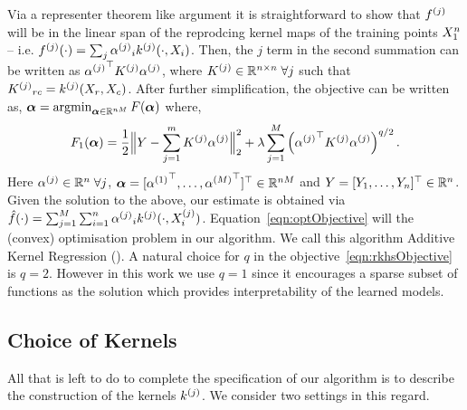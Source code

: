Via a representer theorem like argument it is straightforward to show
that $f^{(j)}$ will be in the linear span of the reprodcing kernel maps of the
training points $X_1^{n}$ -- i.e. $f^{(j)}(\cdot) = 
\sum_j {\alpha^{(j)}}_i k^{(j)}(\cdot, X_i) $.
Then, the $j$ term in the second summation can be written as
${{\alpha^{(j)}}}^\top {K^{(j)}} {\alpha^{(j)}}$,
where ${K^{(j)}} \in \mathbb{R}^{n\times n}\; \forall
j$ such that ${K^{(j)}}_{rc} = k^{(j)}(X_r, X_c)$.
After further simplification, the objective can be written as,
${\bm{\alpha}} = \mathop{\mathrm{argmin}}_{{\bm{\alpha}} \in \mathbb{R}^{nM}} F({\bm{\alpha}})$ where,
\begin{equation}
F_1({\bm{\alpha}}) = \frac{1}{2}\Big\|Y - \sum_{j=1}^m {K^{(j)}} {\alpha^{(j)}}\Big\|_2^2 + 
  \lambda \sum_{j=1}^M \left({{\alpha^{(j)}}}^\top {K^{(j)}} {\alpha^{(j)}}\right)^{q/2}.
\label{eqn:optObjective}
\end{equation}
Here ${\alpha^{(j)}} \in \mathbb{R}^n \; \forall j$, ${\bm{\alpha}} = [{\alpha^{(1)}}^\top, \dots, 
{\alpha^{(M)}}^\top]^\top  \in\mathbb{R}^{nM}$ and $Y = [Y_1, \dots, Y_n]^\top \in
\mathbb{R}^n$. Given the solution to the above, our
estimate is obtained via $\hat{f}(\cdot) = \sum_{j=1}^M \sum_{i=1}^n {\alpha^{(j)}}_i
k^{(j)}(\cdot, X^{(j)}_i)$.
Equation~\eqref{eqn:optObjective} will the (convex) optimisation problem in our
algorithm.
We call this algorithm Additive Kernel Regression (\addkrr).
A natural choice for $q$ in the objective~\eqref{eqn:rkhsObjective} is $q=2$. 
However in
this work we use $q=1$ since it encourages a sparse subset of functions as the
solution which provides interpretability of the learned models. 


\subsection{Choice of Kernels}

All that is left to do to complete the specification of our algorithm is to
describe the construction of the kernels $k^{(j)}$. We consider two settings
in this regard.

